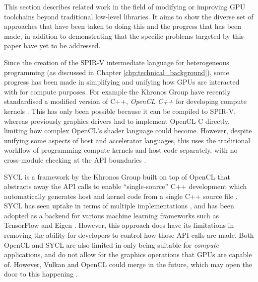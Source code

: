 \documentclass[a4paper,12pt,twoside,openright]{report}
\begin{document}
\label{sec:related_work}

This section describes related work in the field of modifying or improving GPU
toolchains beyond traditional low-level libraries. It aims to show the diverse
set of approaches that have been taken to doing this and the progress that has
been made, in addition to demonstrating that the specific problems targeted by
this paper have yet to be addressed.

Since the creation of the SPIR-V intermediate language for heterogeneous
programming (as discussed in Chapter \ref{chp:technical_background}), some
progress has been made in simplifying and unifying how GPUs are interacted with
for compute purposes. For example the Khronos Group have recently standardised
a modified version of C++, \textit{OpenCL C++} for developing compute kernels
\cite{OpenCL22Release} \cite{OpenCLCPPWhitePaper} \cite{OpenCL}. This has only
been possible because it can be compiled to SPIR-V, whereas previously graphics
drivers had to implement OpenCL C directly, limiting how complex OpenCL's
shader language could become. However, despite unifying some aspects of host
and accelerator languages, this uses the traditional workflow of programming
compute kernels and host code separately, with no cross-module checking at the
API boundaries \cite{OpenCL22Release}.

SYCL is a framework by the Khronos Group built on top of OpenCL that abstracts
away the API calls to enable ``single-source'' C++ development which
automatically generates host and kernel code from a single C++ source file
\cite{OpenCL22Release} \cite{SYCL}. SYCL has seen uptake in terms of multiple
implementations \cite{ComputeCPP} \cite{triSYCL}, and has been adopted as a
backend for various machine learning frameworks such as TensorFlow and Eigen
\cite{SYCLTensorFlow} \cite{SYCLEigen}. However, this approach does have its
limitations in removing the ability for developers to control how those API
calls are made. Both OpenCL and SYCL are also limited in only being suitable
for \textit{compute} applications, and do not allow for the graphics operations
that GPUs are capable of. However, Vulkan and OpenCL could merge in the future,
which may open the door to this happening \cite{VulkanOpenCLMerge}.
\end{document}
